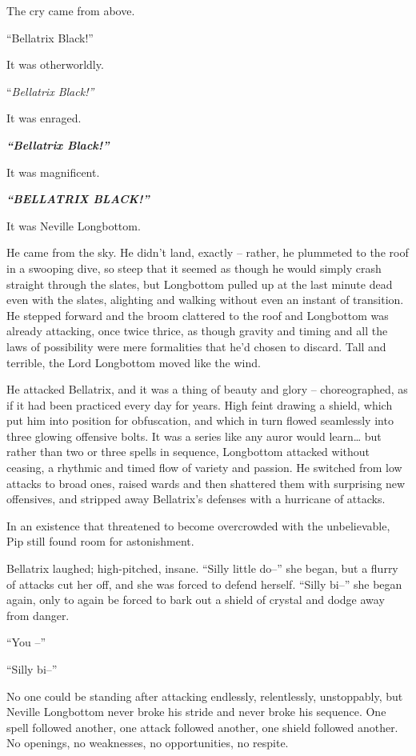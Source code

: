 The cry came from above.

``Bellatrix Black!''

It was otherworldly.

``\emph{Bellatrix Black!''}

It was enraged.

\textbf{\emph{``Bellatrix Black!''}}

It was magnificent.

\textbf{\emph{``BELLATRIX BLACK!''}}

It was Neville Longbottom.

He came from the sky. He didn't land, exactly -- rather, he plummeted to
the roof in a swooping dive, so steep that it seemed as though he would
simply crash straight through the slates, but Longbottom pulled up at
the last minute dead even with the slates, alighting and walking without
even an instant of transition. He stepped forward and the broom
clattered to the roof and Longbottom was already attacking, once twice
thrice, as though gravity and timing and all the laws of possibility
were mere formalities that he'd chosen to discard. Tall and terrible,
the Lord Longbottom moved like the wind.

He attacked Bellatrix, and it was a thing of beauty and glory --
choreographed, as if it had been practiced every day for years. High
feint drawing a shield, which put him into position for obfuscation, and
which in turn flowed seamlessly into three glowing offensive bolts. It
was a series like any auror would learn\ldots{} but rather than two or
three spells in sequence, Longbottom attacked without ceasing, a
rhythmic and timed flow of variety and passion. He switched from low
attacks to broad ones, raised wards and then shattered them with
surprising new offensives, and stripped away Bellatrix's defenses with a
hurricane of attacks.

In an existence that threatened to become overcrowded with the
unbelievable, Pip still found room for astonishment.

Bellatrix laughed; high-pitched, insane. ``Silly little do--'' she
began, but a flurry of attacks cut her off, and she was forced to defend
herself. ``Silly bi--'' she began again, only to again be forced to bark
out a shield of crystal and dodge away from danger.

``You --''

``Silly bi--''

No one could be standing after attacking endlessly, relentlessly,
unstoppably, but Neville Longbottom never broke his stride and never
broke his sequence. One spell followed another, one attack followed
another, one shield followed another. No openings, no weaknesses, no
opportunities, no respite.

